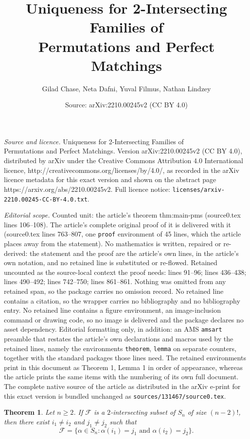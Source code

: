 \documentclass[10pt,a4paper]{amsart}
\title{Uniqueness for 2-Intersecting Families of \\ Permutations and Perfect Matchings}
\author{Gilad Chase, Neta Dafni, Yuval Filmus, Nathan Lindzey}
\date{Source: arXiv:2210.00245v2 (CC BY 4.0)}
\newtheorem{theorem}{Theorem}
\begin{document}
\maketitle

\noindent\emph{Source and licence.} Uniqueness for 2-Intersecting Families of \\ Permutations and Perfect Matchings. Version arXiv:2210.00245v2 (CC BY 4.0), distributed by arXiv under the Creative Commons Attribution 4.0 International licence, http://creativecommons.org/licenses/by/4.0/, as recorded in the arXiv licence metadata for this exact version and shown on the abstract page https://arxiv.org/abs/2210.00245v2. Full licence notice: \texttt{licenses/arxiv-2210.00245-CC-BY-4.0.txt}.\par\smallskip

\noindent\textit{Editorial scope.} Counted unit: the article's theorem thm:main-pms (source0.tex lines 106--108). The article's complete original proof of it is delivered with it (source0.tex lines 763--807, one \texttt{proof} environment of 45 lines, which the article places away from the statement). No mathematics is written, repaired or re-derived: the statement and the proof are the article's own lines, in the article's own notation, and no retained line is substituted or re-flowed.  Retained uncounted as the source-local context the proof needs: lines 91--96; lines 436--438; lines 490--492; lines 742--750; lines 861--861.  Nothing was omitted from any retained span, so the package carries no omission record.  No retained line contains a citation, so the wrapper carries no bibliography and no bibliography entry.  No retained line contains a figure environment, an image-inclusion command or drawing code, so no image is delivered and the package declares no asset dependency.  Editorial formatting only, in addition: an AMS \texttt{amsart} preamble that restates the article's own declarations and macros used by the retained lines, namely the environments \texttt{theorem}, \texttt{lemma} on separate counters, together with the standard packages those lines need.  The retained environments print in this document as Theorem 1, Lemma 1 in order of appearance, whereas the article prints the same items with the numbering of its own full document.  The complete native source of the article as distributed in the arXiv e-print for this exact version is bundled unchanged as \texttt{sources/131467/source0.tex}.
\begin{theorem} \label{thm:main-sym}
Let $n \geq 2$. If $\mathcal{F}$ is a $2$-intersecting subset of $S_n$ of size $(n-2)!$, then there exist $i_1 \neq i_2$ and $j_1 \neq j_2$ such that
\[
 \mathcal{F} = \{ \alpha \in S_n : \alpha(i_1) = j_1 \text{ and } \alpha(i_2) = j_2 \}.
\]
\end{theorem}
\end{document}
